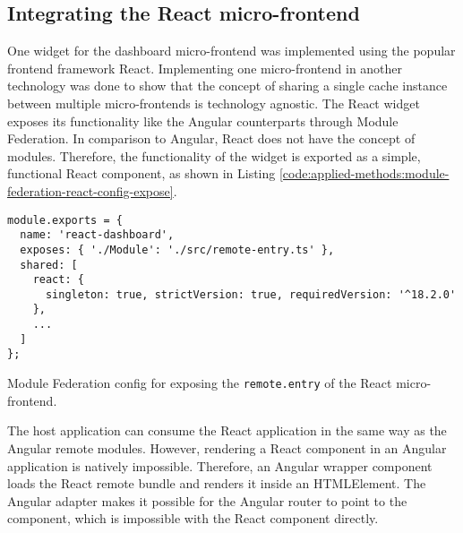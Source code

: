 \subsection{Integrating the React micro-frontend}\label{subsection:applied-methods:prototypical-implementation:react-micro-frontend}

One widget for the dashboard micro-frontend was implemented using the popular frontend framework React. Implementing one micro-frontend in another technology was done to show that the concept of sharing a single cache instance between multiple micro-frontends is technology agnostic. The React widget exposes its functionality like the Angular counterparts through Module Federation. In comparison to Angular, React does not have the concept of modules. Therefore, the functionality of the widget is exported as a simple, functional React component, as shown in Listing  \ref{code:applied-methods:module-federation-react-config-expose}.

\ifshowListings
\begin{listing}[H]
    \begin{verbatim}
module.exports = {
  name: 'react-dashboard',
  exposes: { './Module': './src/remote-entry.ts' },
  shared: [
    react: {
      singleton: true, strictVersion: true, requiredVersion: '^18.2.0' 
    },
    ...
  ]
};
    \end{verbatim}
    \caption{Module Federation config for exposing the \texttt{remote.entry} of the React micro-frontend.}\label{code:applied-methods:module-federation-react-config-expose}
\end{listing}
\fi

\noindent The host application can consume the React application in the same way as the Angular remote modules. However, rendering a React component in an Angular application is natively impossible. Therefore, an Angular wrapper component loads the React remote bundle and renders it inside an HTMLElement. The Angular adapter makes it possible for the Angular router to point to the component, which is impossible with the React component directly.

\bigskip

